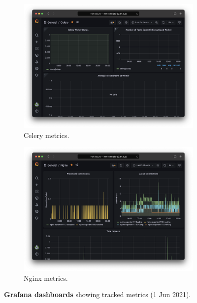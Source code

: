 \begin{figure}[!h]
\begin{subfigure}[h]{0.45\textwidth}
		\includegraphics[width=\textwidth]{images/app-server/grafana-celery}
		\caption{Celery metrics.}
	\end{subfigure}
	\begin{subfigure}[h]{0.45\textwidth}
		\includegraphics[width=\textwidth]{images/app-server/grafana-nginx}
		\caption{Nginx metrics.}
	\end{subfigure}
	\caption[Grafana dashboards]{\textbf{Grafana dashboards} showing tracked metrics (1 Jun 2021).}
\label{fig:grafana}
\end{figure}

